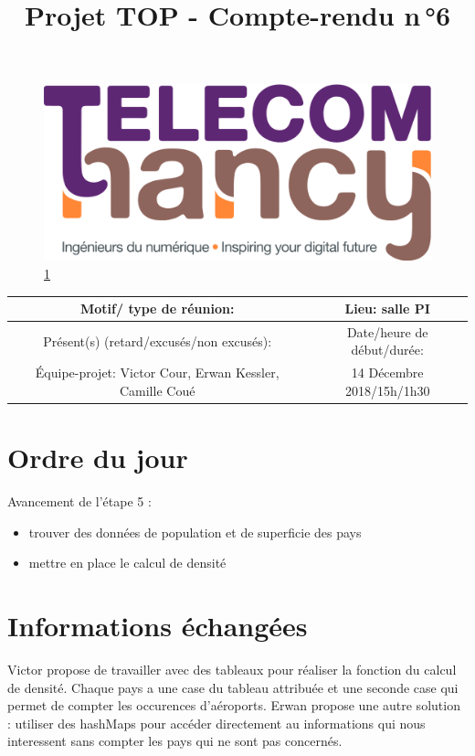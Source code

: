 \documentclass{article}
\date{}
\begin{document}
\begin{figure}
    \centering
    \includegraphics[scale=0.05]{logo_TNCY.png}
    \label{fig:logo_tncy}
    \ref{fig:logo_tncy}
\end{figure}
\title{Projet TOP - Compte-rendu n\,°6}
\maketitle
\vspace*{-1cm}

\begin{tabular}{|c|c|}
  \hline
  Motif/ type de réunion: & Lieu: salle PI \\
  \hline
   Présent(s) (retard/excusés/non excusés): &  Date/heure de début/durée:\\
  Équipe-projet: Victor Cour,
                  Erwan Kessler,
                  Camille Coué
 & 14 Décembre 2018/15h/1h30 \\
  \hline
\end{tabular}


\section{Ordre du jour}

Avancement de l'étape 5 :
\begin{itemize}
  \item trouver des données de population et de superficie des pays 
  \item mettre en place le calcul de densité 
\end{itemize}

\section{Informations échangées}
Victor propose de travailler avec des tableaux pour réaliser la fonction du calcul de densité. Chaque pays a une case du tableau attribuée et une seconde case qui permet de compter les occurences d'aéroports. Erwan propose une autre solution : utiliser des hashMaps pour accéder directement au informations qui nous interessent sans compter les pays qui ne sont pas concernés.
\end{document}
